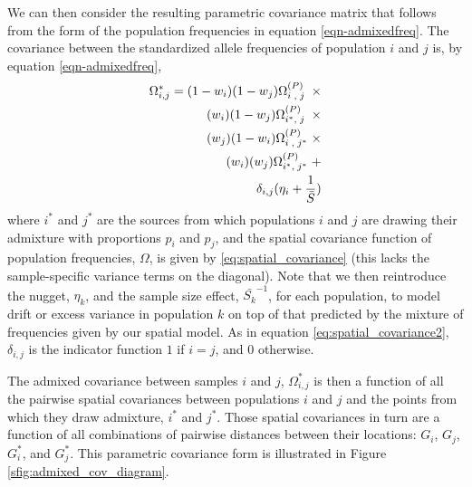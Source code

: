 \documentclass[12pt]{article}
\newcommand{\kadmixsource}[1]{{$G^{*}_{#1}$}}
\newcommand{\identifyadmixsource}[1]{{#1^{*}}}
\begin{document}
We can then consider the resulting parametric covariance matrix that follows from the form of the population frequencies in equation \eqref{eqn-admixedfreq}. The covariance between the standardized allele frequencies of population $i$ and $j$ is, by equation \eqref{eqn-admixedfreq},
\begin{alignat}{3}
\label{eq:admixed_covariance_1}
\identifyadmixsource{\Omega_{i,j}} = (1-w_i)(1-w_j) \Omega^{(P)}_{i\;,\;j\;} \; \times&\\
(w_i)(1-w_j) \Omega^{(P)}_{\identifyadmixsource{i},\;j\;} \; \times   \notag&\\
(w_j)(1-w_i) \Omega^{(P)}_{i\;,\;\identifyadmixsource{j}} \; \times   \notag&\\
(w_i)(w_j) \Omega^{(P)}_{\identifyadmixsource{i},\;\identifyadmixsource{j}} \; +   \notag&\\
\delta_{i,j} (\eta_i + \frac{1}{\bar{S}}) \notag&
\end{alignat}
where $\identifyadmixsource{i}$ and $\identifyadmixsource{j}$ are the sources from which populations $i$ and $j$ are drawing their admixture with proportions $p_i$ and $p_j$, and the spatial covariance function of population frequencies, $\Omega$, is given by \eqref{eq:spatial_covariance} (this lacks the sample-specific variance terms on the diagonal). Note that we then reintroduce the nugget, $\eta_k$, and the sample size effect, $\bar{S_k}^{-1}$, for each population, to model drift or excess variance in population $k$ on top of that predicted by the mixture of frequencies given by our spatial model.  As in equation \eqref{eq:spatial_covariance2}, $\delta_{i,j} $ is the indicator function $1$ if $i=j$, and $0$ otherwise. 


The admixed covariance between samples $i$ and $j$, $\identifyadmixsource{\Omega_{i,j}}$ is then a function of all the pairwise spatial covariances between populations $i$ and $j$ and the points from which they draw admixture, $\identifyadmixsource{i}$ and $\identifyadmixsource{j}$.  Those spatial covariances in turn are a function of all combinations of pairwise distances between their locations: $G_i$, $G_j$, \kadmixsource{i}, and \kadmixsource{j}.  This parametric covariance form is illustrated in Figure \ref{sfig:admixed_cov_diagram}.
\end{document}
